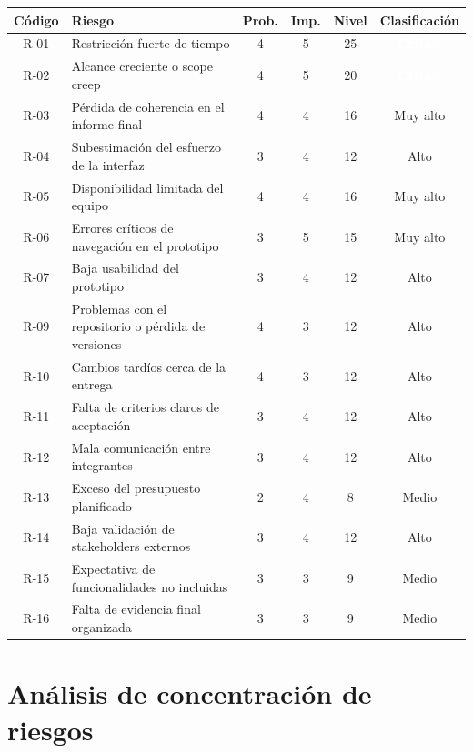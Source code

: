 \documentclass[11pt,spanish]{article}
\begin{document}
\begin{table}[H]
\centering
\begin{tabularx}{\textwidth}{c Y c c c c}
\toprule
\textbf{Código} & \textbf{Riesgo} & \textbf{Prob.} & \textbf{Imp.} & \textbf{Nivel} & \textbf{Clasificación} \\
\midrule
R-01 & Restricción fuerte de tiempo & 4 & 5 & 25 & \textcolor{white}{\textbf{Crítico}} \\
R-02 & Alcance creciente o scope creep & 4 & 5 & 20 & \textcolor{white}{\textbf{Crítico}} \\
R-03 & Pérdida de coherencia en el informe final & 4 & 4 & 16 &  Muy alto \\
R-04 & Subestimación del esfuerzo de la interfaz & 3 & 4 & 12 &  Alto \\
R-05 & Disponibilidad limitada del equipo & 4 & 4 & 16 &  Muy alto \\
R-06 & Errores críticos de navegación en el prototipo & 3 & 5 & 15 &  Muy alto \\
R-07 & Baja usabilidad del prototipo & 3 & 4 & 12 &  Alto \\

R-09 & Problemas con el repositorio o pérdida de versiones & 4 & 3 & 12 &  Alto \\
R-10 & Cambios tardíos cerca de la entrega & 4 & 3 & 12 &  Alto \\
R-11 & Falta de criterios claros de aceptación & 3 & 4 & 12 &  Alto \\
R-12 & Mala comunicación entre integrantes & 3 & 4 & 12 &  Alto \\
R-13 & Exceso del presupuesto planificado & 2 & 4 & 8 &  Medio \\
R-14 & Baja validación de stakeholders externos & 3 & 4 & 12 &  Alto \\
R-15 & Expectativa de funcionalidades no incluidas & 3 & 3 & 9 &  Medio \\
R-16 & Falta de evidencia final organizada & 3 & 3 & 9 &  Medio \\
\bottomrule
\end{tabularx}
\end{table}

\section{Análisis de concentración de riesgos}
\end{document}

